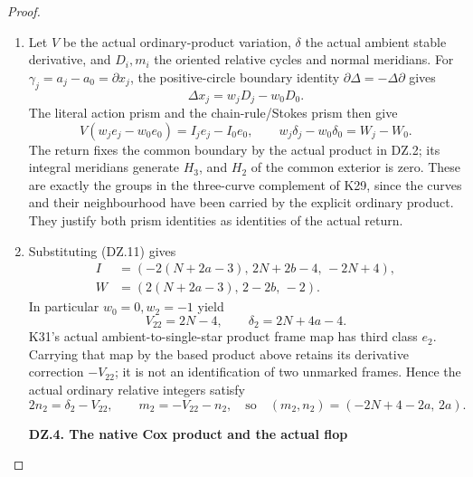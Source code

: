 \begin{proof}
\begin{enumerate}[label=\arabic*.]
\item Let \(V\) be the actual ordinary-product variation, \(\delta\)
the actual ambient stable derivative, and \(D_i,m_i\) the
oriented relative cycles and normal meridians. For
\(\gamma_j=a_j-a_0=\partial x_j\), the positive-circle boundary
identity \(\partial\Delta=-\Delta\partial\) gives
\[
             \Delta x_j=w_jD_j-w_0D_0 .
\]
The literal action prism and the chain-rule/Stokes prism then give
\[
 V(w_je_j-w_0e_0)=I_je_j-I_0e_0,\qquad
 w_j\delta_j-w_0\delta_0=W_j-W_0.                    \tag{DZ.19}
\]
The return fixes the common boundary by the actual product in
DZ.2; its integral meridians generate \(H_3\), and \(H_2\) of the
common exterior is zero. These are exactly the groups in the
three-curve complement of K29, since the curves and their
neighbourhood have been carried by the explicit ordinary product.
They justify both prism identities as identities of the actual
return.

\item Substituting (DZ.11) gives
\[
 \begin{split}
 I&=(-2(N+2a-3),\,2N+2b-4,\,-2N+4),\\
 W&=(2(N+2a-3),\,2-2b,\,-2).
 \end{split}                                          \tag{DZ.20}
\]
In particular \(w_0=0,w_2=-1\) yield
\[
                  V_{22}=2N-4,\qquad
                  \delta_2=2N+4a-4.                 \tag{DZ.21}
\]
K31's actual ambient-to-single-star product frame map has third
class \(e_2\). Carrying that map by the based product above retains
its derivative correction \(-V_{22}\); it is not an identification
of two unmarked frames. Hence the actual ordinary relative
integers satisfy
\[
 2n_2=\delta_2-V_{22},\qquad m_2=-V_{22}-n_2,
 \quad\text{so}\quad
           (m_2,n_2)=(-2N+4-2a,\,2a).               \tag{DZ.22}
\]

\par

\medskip\noindent\textbf{DZ.4. The native Cox product and the actual flop}

\par\nobreak


\end{enumerate}
\end{proof}
